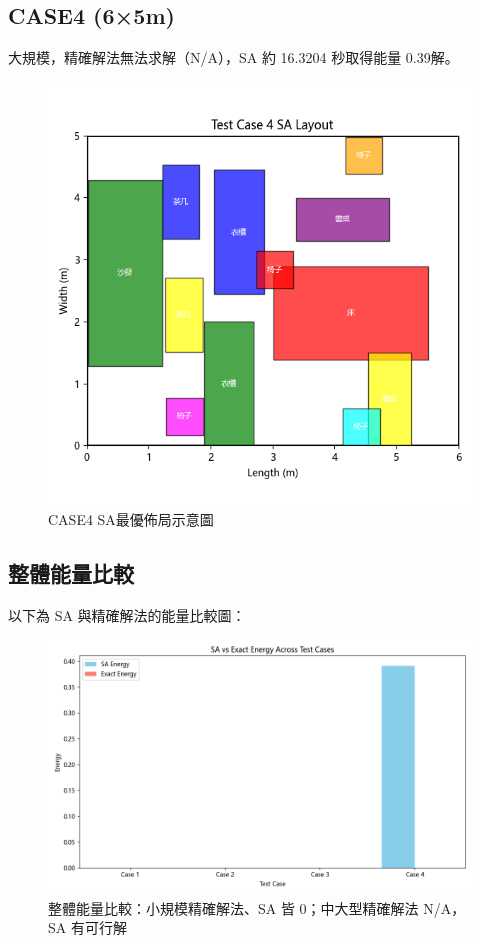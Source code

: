 \documentclass[conference]{IEEEtran}
\begin{document}
\FloatBarrier %

\subsection{CASE4 (6×5m)}
大規模，精確解法無法求解（N/A），SA 約 16.3204 秒取得能量 0.39解。

\begin{figure}[!htbp]
    \centering
    \includegraphics[width=\columnwidth]{sa_layout_test_case_4.png} 
    \caption{CASE4 SA最優佈局示意圖}
    \label{fig:case1_exact_solver} %
\end{figure}

\FloatBarrier %

\subsection{整體能量比較}
以下為 SA 與精確解法的能量比較圖：

\begin{figure}[!htbp]
    \centering
    \includegraphics[width=\columnwidth]{energy_comparison.png} 
    \caption{整體能量比較：小規模精確解法、SA 皆 0；中大型精確解法 N/A，SA 有可行解}
\end{figure}
\end{document}
